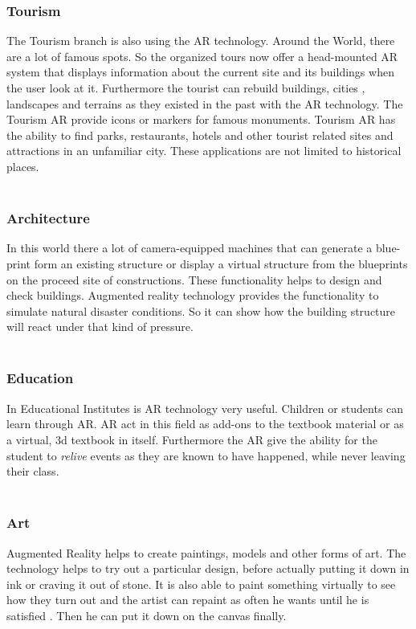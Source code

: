  \subsubsection{Tourism}
 The Tourism branch is also using the AR technology.  Around the World, there are a lot of famous spots. So the organized tours now offer a head-mounted AR system that displays information about the current site and its buildings when the user look at it.  Furthermore the tourist can rebuild buildings, cities , landscapes and terrains as they existed in the past with the AR technology. The Tourism AR provide icons or markers for famous monuments. Tourism AR has the ability to find parks, restaurants, hotels and other tourist related sites and attractions in an unfamiliar city. These applications are not limited to historical places.\cite{AugmentedBook}
 \\
 \\
 \subsubsection{Architecture}
 In this world there a lot of camera-equipped machines that can generate a blue-print
 form an existing structure or display a virtual structure from the  blueprints on the proceed site of constructions.  These functionality helps to design and check buildings. Augmented  reality technology provides the functionality to simulate natural disaster conditions. So it can show how the building structure will react under that kind of pressure.\cite{AugmentedBook}
 \\
 \\
 \subsubsection{Education}
 In Educational Institutes is AR technology very useful. Children or students can learn through AR. AR act in this field as  add-ons to the textbook material or as a virtual, 3d textbook in itself. Furthermore the AR give the ability for the student to \textit{relive} events as they are known to have happened, while never leaving their class.\cite{AugmentedBook}
 \\
 \\
 \subsubsection{Art}
 Augmented Reality helps  to create paintings, models and other forms of art.  The technology helps  to try out a particular design, before  actually putting it down in ink or craving it out of stone. It is also able to paint something virtually to see how they turn out and the artist can repaint as often he wants until he is satisfied . Then he can put it down on the canvas finally.\cite{AugmentedBook}
 \\

